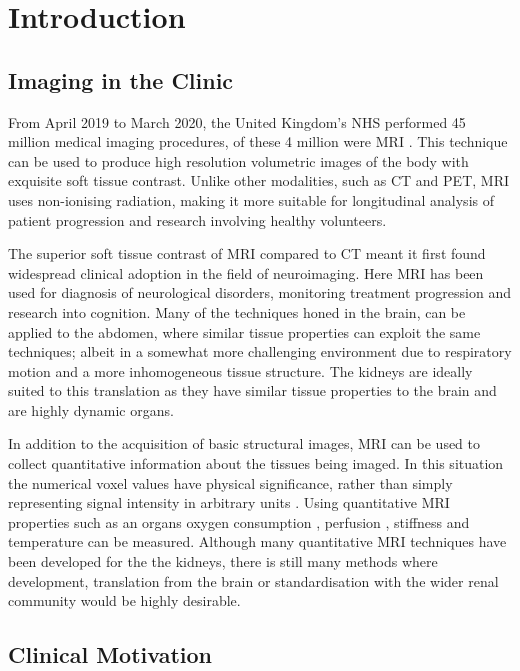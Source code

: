 \chapter{Introduction}
\label{chap:intro}
\section{Imaging in the Clinic}
\label{sec:intro_imaging}
From April 2019 to March 2020, the United Kingdom's \ac{NHS} performed 45 million medical imaging procedures, of these 4 million were \ac{MRI} \cite{noauthor_diagnostic_2020}. This technique can be used to produce high resolution volumetric images of the body with exquisite soft tissue contrast. Unlike other modalities, such as \ac{CT} and \ac{PET}, \ac{MRI} uses non-ionising radiation, making it more suitable for longitudinal analysis of patient progression and research involving healthy volunteers.

The superior soft tissue contrast of \ac{MRI} compared to \ac{CT} meant it first found widespread clinical adoption in the field of neuroimaging. Here \ac{MRI} has been used for diagnosis of neurological disorders, monitoring treatment progression and research into cognition. Many of the techniques honed in the brain, can be applied to the abdomen, where similar tissue properties can exploit the same techniques; albeit in a somewhat more challenging environment due to respiratory motion and a more inhomogeneous tissue structure. The kidneys are ideally suited to this translation as they have similar tissue properties to the brain and are highly dynamic organs.

In addition to the acquisition of basic structural images, \ac{MRI} can be used to collect quantitative information about the tissues being imaged. In this situation the numerical voxel values have physical significance, rather than simply representing signal intensity in arbitrary units \cite{tofts_quantitative_2003}. Using quantitative \ac{MRI} properties such as an organs oxygen consumption \cite{zhang_quantitative_2015}, perfusion \cite{karger_quantitation_2000}, stiffness \cite{mariappan_magnetic_2010} and temperature \cite{yuan_towards_2012} can be measured. Although many quantitative \ac{MRI} techniques have been developed for the the kidneys, there is still many methods where development, translation from the brain or standardisation with the wider renal community would be highly desirable.

\section{Clinical Motivation}
\label{sec:intro_clinical}


